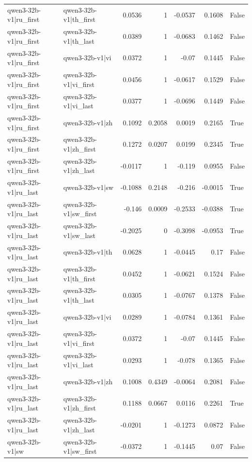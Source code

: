 \begin{table}
\begin{tabular}{l l r r r r l}
qwen3-32b-v1|ru_first & qwen3-32b-v1|th_first & 0.0536 & 1 & -0.0537 & 0.1608 & False \\
qwen3-32b-v1|ru_first & qwen3-32b-v1|th_last & 0.0389 & 1 & -0.0683 & 0.1462 & False \\
qwen3-32b-v1|ru_first & qwen3-32b-v1|vi & 0.0372 & 1 & -0.07 & 0.1445 & False \\
qwen3-32b-v1|ru_first & qwen3-32b-v1|vi_first & 0.0456 & 1 & -0.0617 & 0.1529 & False \\
qwen3-32b-v1|ru_first & qwen3-32b-v1|vi_last & 0.0377 & 1 & -0.0696 & 0.1449 & False \\
qwen3-32b-v1|ru_first & qwen3-32b-v1|zh & 0.1092 & 0.2058 & 0.0019 & 0.2165 & True \\
qwen3-32b-v1|ru_first & qwen3-32b-v1|zh_first & 0.1272 & 0.0207 & 0.0199 & 0.2345 & True \\
qwen3-32b-v1|ru_first & qwen3-32b-v1|zh_last & -0.0117 & 1 & -0.119 & 0.0955 & False \\
qwen3-32b-v1|ru_last & qwen3-32b-v1|sw & -0.1088 & 0.2148 & -0.216 & -0.0015 & True \\
qwen3-32b-v1|ru_last & qwen3-32b-v1|sw_first & -0.146 & 0.0009 & -0.2533 & -0.0388 & True \\
qwen3-32b-v1|ru_last & qwen3-32b-v1|sw_last & -0.2025 & 0 & -0.3098 & -0.0953 & True \\
qwen3-32b-v1|ru_last & qwen3-32b-v1|th & 0.0628 & 1 & -0.0445 & 0.17 & False \\
qwen3-32b-v1|ru_last & qwen3-32b-v1|th_first & 0.0452 & 1 & -0.0621 & 0.1524 & False \\
qwen3-32b-v1|ru_last & qwen3-32b-v1|th_last & 0.0305 & 1 & -0.0767 & 0.1378 & False \\
qwen3-32b-v1|ru_last & qwen3-32b-v1|vi & 0.0289 & 1 & -0.0784 & 0.1361 & False \\
qwen3-32b-v1|ru_last & qwen3-32b-v1|vi_first & 0.0372 & 1 & -0.07 & 0.1445 & False \\
qwen3-32b-v1|ru_last & qwen3-32b-v1|vi_last & 0.0293 & 1 & -0.078 & 0.1365 & False \\
qwen3-32b-v1|ru_last & qwen3-32b-v1|zh & 0.1008 & 0.4349 & -0.0064 & 0.2081 & False \\
qwen3-32b-v1|ru_last & qwen3-32b-v1|zh_first & 0.1188 & 0.0667 & 0.0116 & 0.2261 & True \\
qwen3-32b-v1|ru_last & qwen3-32b-v1|zh_last & -0.0201 & 1 & -0.1273 & 0.0872 & False \\
qwen3-32b-v1|sw & qwen3-32b-v1|sw_first & -0.0372 & 1 & -0.1445 & 0.07 & False \\

\end{tabular}
\end{table}
